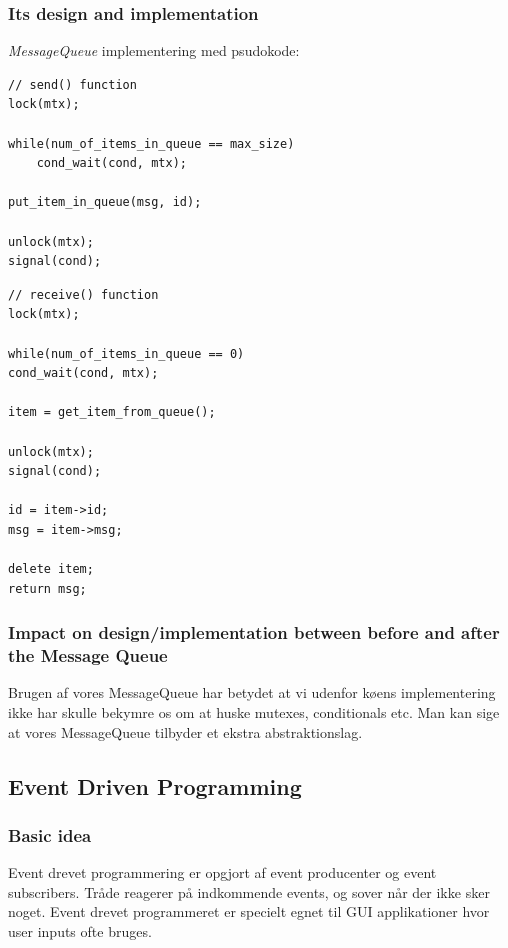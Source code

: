 \subsubsection{Its design and implementation}
\textit{MessageQueue} implementering med psudokode:

\begin{lstlisting}[otherkeywords={un, lock, signal, cond_wait}]
// send() function
lock(mtx);

while(num_of_items_in_queue == max_size)
	cond_wait(cond, mtx);
	
put_item_in_queue(msg, id);

unlock(mtx);
signal(cond);
\end{lstlisting}

\begin{lstlisting}
// receive() function
lock(mtx);

while(num_of_items_in_queue == 0)
cond_wait(cond, mtx);

item = get_item_from_queue();

unlock(mtx);
signal(cond);

id = item->id;
msg = item->msg;

delete item;
return msg;
\end{lstlisting}

\subsubsection{Impact on design/implementation between before and after the Message Queue}

Brugen af vores MessageQueue har betydet at vi udenfor køens implementering ikke har skulle bekymre os om at huske mutexes, conditionals etc. Man kan sige at vores MessageQueue tilbyder et ekstra abstraktionslag.

\subsection{Event Driven Programming}

\subsubsection{Basic idea}
Event drevet programmering er opgjort af event producenter og event subscribers.
Tråde reagerer på indkommende events, og sover når der ikke sker noget.
Event drevet programmeret er specielt egnet til GUI applikationer hvor user inputs ofte bruges. \\


